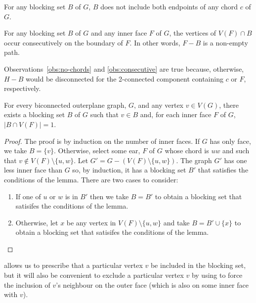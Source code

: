 \documentclass{patmorin}
\begin{document}
\begin{obs}
   For any blocking set $B$ of $G$, $B$ does not include both endpoints
   of any chord $c$ of $G$. 
\end{obs}

\begin{obs}
   For any blocking set $B$ of $G$ and any inner face $F$ of $G$, the
   vertices of $V(F)\cap B$ occur consecutively on the boundary of $F$. 
   In other words, $F-B$ is a non-empty path.  
\end{obs}

Observations~\ref{obs:no-chords} and \ref{obs:consecutive} are true
because, otherwise, $H-B$ would be disconnected for the 2-connected
component containing $c$ or $F$, respectively.



\begin{lem}
  For every biconnected outerplane graph, $G$, and any vertex $v\in
  V(G)$, there exists a blocking set $B$ of $G$ such that $v\in B$ and,
  for each inner face $F$ of $G$, $|B\cap V(F)|=1$.
\end{lem}

\begin{proof}
  The proof is by induction on the number of inner faces.  If $G$ has
  only face, we take $B=\{v\}$.  Otherwise, select some ear, $F$ of $G$
  whose chord is $uw$ and such that $v\not\in V(F)\setminus\{u,w\}$.
  Let $G'=G-(V(F)\setminus\{u,w\})$.  The graph $G'$ has one less inner
  face than $G$ so, by induction, it has a blocking set $B'$ that satisfies
  the conditions of the lemma.  There are two cases to consider:
  \begin{enumerate}
    \item If one of $u$ or $w$ is in $B'$ then we take $B=B'$ to obtain
      a blocking set that satisifes the conditions of the lemma.

    \item Otherwise, let $x$ be any vertex in $V(F)\setminus\{u,w\}$ and
      take $B=B'\cup\{x\}$ to obtain a blocking set that satisifes the
      conditions of the lemma. \qedhere
  \end{enumerate}
\end{proof}

 allows us to prescribe that a particular vertex
$v$ be included in the blocking set, but it will also be convenient to
exclude a particular vertex $v$ by using  to force
the inclusion of $v$'s neighbour on the outer face (which is also on
some inner face with $v$).
\end{document}
